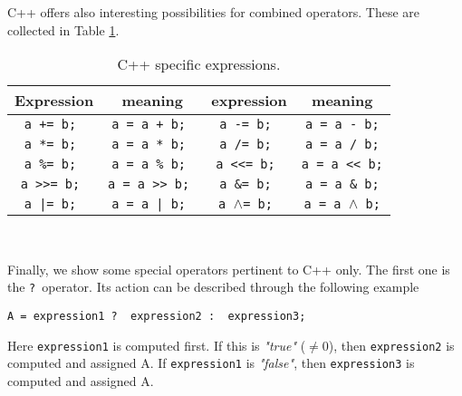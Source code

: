 C++ offers also interesting possibilities for combined operators. 
These are collected in Table \ref{tab:cexpressions4}.
%
\begin{table}
\begin{center}
\begin{tabular}{|cc|cc|} \hline
Expression & meaning & expression & meaning\\ \hline
\tt a += b;  & \tt a = a + b;  & \tt a  -= b;  & \tt a = a  -
b;\\
\tt a *= b;  & \tt a = a * b;  & \tt a  /= b;  & \tt a = a  /
b;\\
\tt a \%= b;  & \tt a = a \% b;  & \tt a <<= b;  & \tt a = a 
<< b;\\
\tt a >>= b; & \tt a = a >> b; & \tt a \&= b;  & \tt a = a \&
b;\\
\tt a |= b;  & \tt a = a | b;  & \tt a $\scriptstyle \wedge$=
b;  & 
\tt a = a $\scriptstyle \wedge$ b;\\
\hline
\end{tabular}\\[1ex]
\caption{C++ specific expressions. \label{tab:cexpressions4}}
\end{center}
\end{table}

Finally, we show some special operators pertinent to C++ only.
The first one is
the {\tt ?}\ operator. 
Its action can be described through the following example
\begin{center}
{\tt A = expression1\ ? \ expression2\ : \ expression3;}
\end{center}
%
Here {\tt expression1} is computed first. If this is 
{\em"true"} 
($\neq 0$), then {\tt expression2} is computed and assigned  A. If
{\tt expression1}
is {\em"false"}, then {\tt expression3} is computed and assigned A.  


